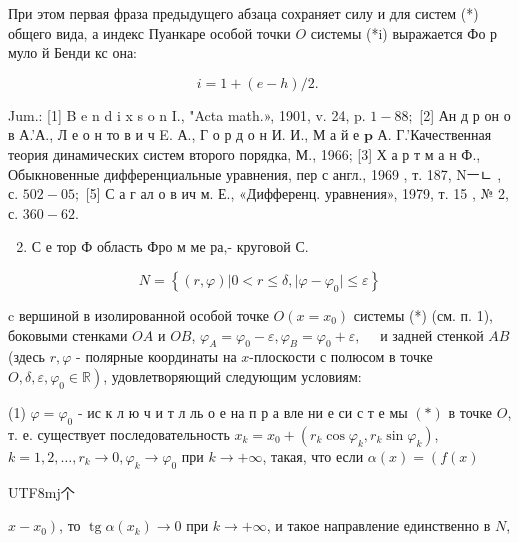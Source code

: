 \documentclass[10pt]{article}
\begin{document}
При этом первая фраза предыдущего абзаца сохраняет силу и для систем (*) общего вида, а индекс Пуанкаре особой точки $O$ системы (*i) выражается Фо р муло й Бенди кс она:



\[

i=1+(e-h) / 2 \text {. }

\]



Jum.: [1] B e n d i x s o n I., "Acta math.», 1901, v. 24, p. $1-88 ;$ [2] Ан д р он о в А.'А., Л е о н то в и ч E. А., Г о р д о н И. И., М а й е $\mathbf{p}$ А. Г.'Качественная теория динамических систем второго порядка, М., 1966; [3] Х а р т м а н Ф., Обыкновенные дифференциальные уравнения, пер с англ., 1969 , т. 187, Nㅡㄴ , с. $502-05 ;$ [5] С а г ал о в ич м. Е., «Дифференц. уравнения», 1979, т. 15 , № 2, с. $360-62$.



\begin{enumerate}

  \setcounter{enumi}{1}

  \item С е тор Ф область Фро м ме ра,- круговой С.

\end{enumerate}



\[

N=\left\{(r, \varphi)|0<r \leqslant \delta,| \varphi-\varphi_{0} \mid \leqslant \varepsilon\right\}

\]



c вершиной в изолированной особой точке $O\left(x=x_{0}\right)$ системы (*) (см. п. 1), боковыми стенками $O A$ и $O B$, $\varphi_{A}=\varphi_{0}-\varepsilon, \varphi_{B}=\varphi_{0}+\varepsilon, \quad$ и задней стенкой $A B$ (здесь $r, \varphi$ - полярные координаты на $x$-плоскости с полюсом в точке $\left.O, \delta, \varepsilon, \varphi_{0} \in \mathbb{R}\right)$, удовлетворяющий следующим условиям:



(1) $\varphi=\varphi_{0}$ - ис к л ю ч и т л ль о е на п р а вле ни е си с т е мы $(*)$ в точке $O$, т. е. существует последовательность $x_{k}=x_{0}+\left(r_{k} \cos \varphi_{k}, r_{k} \sin \varphi_{k}\right)$, $k=1,2, \ldots, r_{k} \rightarrow 0, \varphi_{k} \rightarrow \varphi_{0}$ при $k \rightarrow+\infty$, такая, что если $\alpha(x)=\left(f(x)\right.$ \begin{CJK}{UTF8}{mj}个\end{CJK} $\left.x-x_{0}\right)$, то $\operatorname{tg} \alpha\left(x_{k}\right) \rightarrow 0$ при $k \rightarrow+\infty$, и такое направление единственно в $N$,
\end{document}
